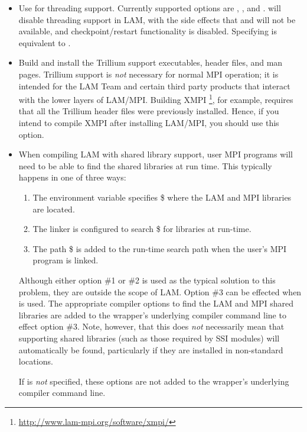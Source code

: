\begin{itemize}
\item {}
  
  Use  for threading support.  Currently supported
  options are , , and .
   will disable threading support in LAM, with the side
  effects that  and
   will not be available, and
  checkpoint/restart functionality is disabled.  Specifying
   is equivalent to
  .


\item {}
  
  Build and install the Trillium support executables, header files,
  and man pages.  Trillium support is {\em not} necessary for normal
  MPI operation; it is intended for the LAM Team and certain third
  party products that interact with the lower layers of LAM/MPI.
  Building XMPI
  \footnote{\url{http://www.lam-mpi.org/software/xmpi/}}, for example,
  requires that all the Trillium header files were previously
  installed.  Hence, if you intend to compile XMPI after installing
  LAM/MPI, you should use this option.


\item {}

  When compiling LAM with shared library support, user MPI programs
  will need to be able to find the shared libraries at run time.  This
  typically happens in one of three ways:

  \begin{enumerate}
  \item The  environment variable
    specifies \$ where the LAM and MPI libraries are
    located.
    
  \item The linker is configured to search \$ for
    libraries at run-time.
    
  \item The path \$ is added to the run-time search
    path when the user's MPI program is linked.
  \end{enumerate}
  
  Although either option \#1 or \#2 is used as the typical solution to
  this problem, they are outside the scope of LAM.  Option \#3 can be
  effected when  is used.  The
  appropriate compiler options to find the LAM and MPI shared
  libraries are added to the wrapper's underlying compiler command
  line to effect option \#3.  Note, however, that this does {\em not}
  necessarily mean that supporting shared libraries (such as those
  required by SSI modules) will automatically be found, particularly
  if they are installed in non-standard locations.
  
  If  is {\em not} specified,
  these options are not added to the wrapper's underlying compiler
  command line.


\end{itemize}

